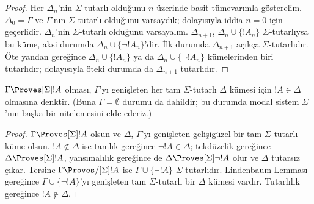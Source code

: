 \documentclass[../../../include/open-logic-section]{subfiles}
\begin{document}
\begin{proof}
Her $\Delta_n$'nin $\Sigma$-tutarlı olduğunu $n$ üzerinde basit
tümevarımla gösterelim. $\Delta_0=\Gamma$ ve $\Gamma$'nın
$\Sigma$-tutarlı olduğunu varsaydık; dolayısıyla iddia $n=0$ için geçerlidir.
$\Delta_n$'nin $\Sigma$-tutarlı olduğunu varsayalım. $\Delta_{n+1}$,
$\Delta_n\cup\{!A_n\}$ $\Sigma$-tutarlıysa bu küme, aksi durumda
$\Delta_n\cup\{\lnot!A_n\}$'dir. İlk durumda $\Delta_{n+1}$ açıkça
$\Sigma$-tutarlıdır. Öte yandan
gereğince $\Delta_n\cup\{!A_n\}$ ya da
$\Delta_n\cup\{\lnot!A_n\}$ kümelerinden biri tutarlıdır; dolayısıyla öteki
durumda da $\Delta_{n+1}$ tutarlıdır.
\end{proof}

\begin{cor}
  $\Gamma\Proves[\Sigma]!A$ olması, $\Gamma$'yı genişleten her tam
  $\Sigma$-tutarlı $\Delta$ kümesi için $!A\in\Delta$ olmasına denktir.
  (Buna $\Gamma=\emptyset$ durumu da dahildir; bu durumda modal sistem
  $\Sigma$'nın başka bir nitelemesini elde ederiz.)
\end{cor}

\begin{proof}
  $\Gamma\Proves[\Sigma]!A$ olsun ve $\Delta$, $\Gamma$'yı genişleten
  gelişigüzel bir tam $\Sigma$-tutarlı küme olsun. $!A\notin\Delta$ ise
  tamlık gereğince $\lnot!A\in\Delta$; tekdüzelik gereğince
  $\Delta\Proves[\Sigma]!A$, yansımalılık gereğince de
  $\Delta\Proves[\Sigma]\lnot!A$ olur ve $\Delta$ tutarsız çıkar. Tersine
  $\Gamma\Proves/[\Sigma]!A$ ise $\Gamma\cup\{\lnot!A\}$
  $\Sigma$-tutarlıdır. Lindenbaum Lemması gereğince
  $\Gamma\cup\{\lnot!A\}$'yı genişleten tam $\Sigma$-tutarlı bir $\Delta$ kümesi
  vardır. Tutarlılık gereğince $!A\notin\Delta$.
\end{proof}
\end{document}
